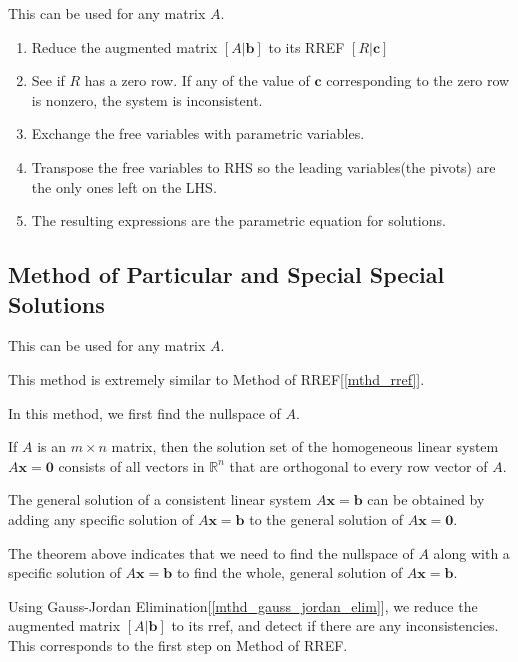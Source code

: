 \documentclass{report}
\begin{document}
		This can be used for any matrix $A$.
		
		\begin{enumerate}
			\item Reduce the augmented matrix $\left[A|\bm{b}\right]$ to its RREF $\left[R|\bm{c}\right]$
			\item See if $R$ has a zero row. If any of the value of $\bm{c}$ corresponding to the zero row is nonzero, the system is inconsistent.
			\item Exchange the free variables with parametric variables.
			\item Transpose the free variables to RHS so the leading variables(the pivots) are the only ones left on the LHS.
			\item The resulting expressions are the parametric equation for solutions.
		\end{enumerate}
		
		\subsection{Method of Particular and Special Special Solutions}
			
			This can be used for any matrix $A$.
			
			This method is extremely similar to Method of RREF[\ref{mthd_rref}].
			
			In this method, we first find the nullspace of $A$.
			
			\begin{thm}
				If $A$ is an $m \times n$ matrix, then the solution set of the homogeneous linear system $A\bm{x}=\bm{0}$ consists of all vectors in $\mathbb{R}^n$ that are orthogonal to every row vector of $A$.
			\end{thm}
			
			\begin{thm}
				The general solution of a consistent linear system $A\bm{x}=\bm{b}$ can be obtained by adding any specific solution of $A\bm{x}=\bm{b}$ to the general solution of $A\bm{x}=\bm{0}$.
			\end{thm}
			
			The theorem above indicates that we need to find the nullspace of $A$ along with a specific solution of $A\bm{x}=\bm{b}$ to find the whole, general solution of $A\bm{x}=\bm{b}$.
			
			Using Gauss-Jordan Elimination[\ref{mthd_gauss_jordan_elim}], we reduce the augmented matrix $\left[A|\bm{b}\right]$ to its rref, and detect if there are any inconsistencies. This corresponds to the first step on Method of RREF.
			
\end{document}

